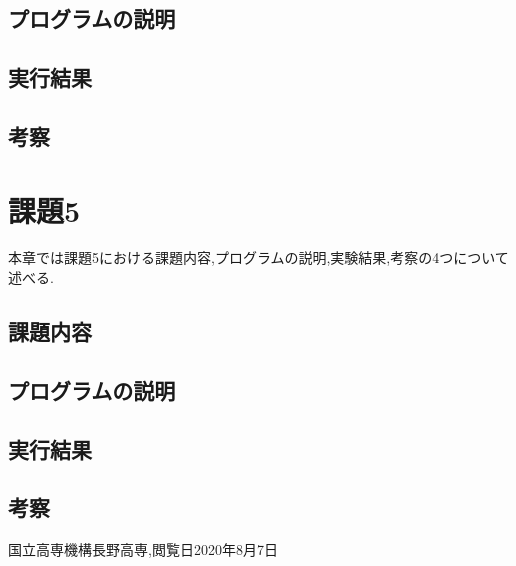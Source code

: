 \documentclass[dvipdfmx]{jarticle}
\begin{document}
    \subsection{プログラムの説明}
    \subsection{実行結果}
    \subsection{考察}

    \section{課題5}
    本章では課題5における課題内容,プログラムの説明,実験結果,考察の4つについて述べる.
    \subsection{課題内容}
    \subsection{プログラムの説明}
    \subsection{実行結果}
    \subsection{考察}

        \begin{thebibliography}{9}
            国立高専機構長野高専,閲覧日2020年8月7日
          \end{thebibliography}
\end{document}
